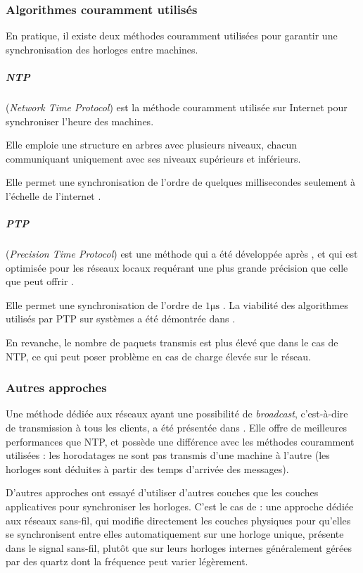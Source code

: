 \subsubsection{Algorithmes couramment utilisés}
En pratique, il existe deux méthodes couramment utilisées pour garantir une synchronisation des horloges entre machines.

\subparagraph{NTP} (\textit{Network Time Protocol}) est la méthode couramment utilisée sur Internet pour synchroniser l'heure des machines.

Elle emploie une structure en arbres avec plusieurs niveaux, chacun communiquant uniquement avec ses niveaux supérieurs et inférieurs.

Elle permet une synchronisation de l'ordre de quelques millisecondes seulement à l'échelle de l'internet \cite{mills1991internet}.
\subparagraph{PTP} (\textit{Precision Time Protocol}) est une méthode qui a été développée après , et qui est optimisée pour les réseaux locaux requérant une plus grande précision que celle que peut offrir .

Elle permet une synchronisation de l'ordre de $\num{1}\si{\micro\second}$ \cite{peng2009research, scheiterer2009synchronization}. La viabilité des algorithmes utilisés par \ac{PTP} sur systèmes  a été démontrée dans \cite{hsu2012measurement}.

En revanche, le nombre de paquets transmis est plus élevé que dans le cas de \ac{NTP}, ce qui peut poser problème en cas de charge élevée sur le réseau.
\subsubsection{Autres approches}
Une méthode dédiée aux réseaux ayant une possibilité de \textit{broadcast}, c'est-à-dire de transmission à tous les clients, a été présentée dans \cite{elson2002fine}. Elle offre de meilleures performances que \ac{NTP}, et possède une différence avec les méthodes couramment utilisées : les horodatages ne sont pas transmis d'une machine à l'autre (les horloges sont déduites à partir des temps d'arrivée des messages).

D'autres approches ont essayé d'utiliser d'autres couches que les couches applicatives pour synchroniser les horloges. C'est le cas de \cite{abari2014one} : une approche dédiée aux réseaux sans-fil, qui modifie directement les couches physiques pour qu'elles se synchronisent entre elles automatiquement sur une horloge unique, présente dans le signal sans-fil, plutôt que sur leurs horloges internes généralement gérées par des quartz dont la fréquence peut varier légèrement.

